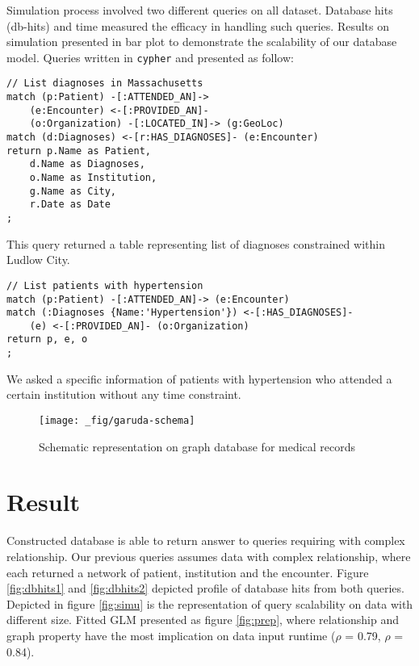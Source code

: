 \documentclass[]{article}
\begin{document}
Simulation process involved two different queries on all dataset.
Database hits (db-hits) and time measured the efficacy in handling such
queries. Results on simulation presented in bar plot to demonstrate the
scalability of our database model. Queries written in \texttt{cypher}
and presented as follow:

\begin{verbatim}
// List diagnoses in Massachusetts
match (p:Patient) -[:ATTENDED_AN]->
    (e:Encounter) <-[:PROVIDED_AN]- 
    (o:Organization) -[:LOCATED_IN]-> (g:GeoLoc)
match (d:Diagnoses) <-[r:HAS_DIAGNOSES]- (e:Encounter)
return p.Name as Patient,
    d.Name as Diagnoses,
    o.Name as Institution,
    g.Name as City,
    r.Date as Date 
;
\end{verbatim}

This query returned a table representing list of diagnoses constrained
within Ludlow City.

\begin{verbatim}
// List patients with hypertension
match (p:Patient) -[:ATTENDED_AN]-> (e:Encounter)
match (:Diagnoses {Name:'Hypertension'}) <-[:HAS_DIAGNOSES]-
    (e) <-[:PROVIDED_AN]- (o:Organization)
return p, e, o
;
\end{verbatim}

We asked a specific information of patients with hypertension who
attended a certain institution without any time constraint.

\begin{figure}

{\centering \texttt{[image: \_fig/garuda-schema]} 

}

\caption{\label{fig:garuda.schema} Schematic representation on graph
database for medical records}\label{fig:fig:garuda.schema}
\end{figure}

\hypertarget{result}{%
\section{Result}\label{result}}

Constructed database is able to return answer to queries requiring with
complex relationship. Our previous queries assumes data with complex
relationship, where each returned a network of patient, institution and
the encounter. Figure \ref{fig:dbhits1} and \ref{fig:dbhits2} depicted
profile of database hits from both queries. Depicted in figure
\ref{fig:simu} is the representation of query scalability on data with
different size. Fitted GLM presented as figure \ref{fig:prep}, where
relationship and graph property have the most implication on data input
runtime (\(\rho\) = 0.79, \(\rho\) = 0.84).
\end{document}
